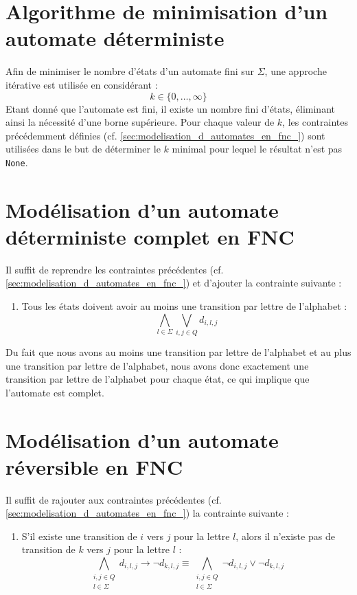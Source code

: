 \documentclass[a4paper, 12pt]{extarticle}
\begin{document}
\section{Algorithme de minimisation d'un automate déterministe}
\label{sec:algo_minimisation}
\noindent Afin de minimiser le nombre d'états d'un automate fini sur $\Sigma$, une approche itérative est utilisée en considérant :
\begin{equation*}
    k\in\{0,\dots,\infty\}
\end{equation*}
Etant donné que l'automate est fini, il existe un nombre fini d'états, éliminant ainsi la nécessité d'une borne supérieure.
Pour chaque valeur de $k$, les contraintes précédemment définies (cf. \ref{sec:modelisation_d_automates_en_fnc_}) sont utilisées
dans le but de déterminer le $k$ minimal pour lequel le résultat n'est pas \texttt{None}.


\section{Modélisation d'un automate déterministe complet en FNC} 
\label{sec:automate_deterministe_complet}
\noindent Il suffit de reprendre les contraintes précédentes (cf. \ref{sec:modelisation_d_automates_en_fnc_}) et d'ajouter la
contrainte suivante :
\begin{enumerate}
    \item Tous les états doivent avoir au moins une transition par lettre de l'alphabet :
    \begin{equation*}
        \bigwedge_{l \in \Sigma} \bigvee_{i,j\in Q} d_{i,l,j}
    \end{equation*}
\end{enumerate}
Du fait que nous avons au moins une transition par lettre de l'alphabet et au plus une transition par lettre de l'alphabet,
nous avons donc exactement une transition par lettre de l'alphabet pour chaque état, ce qui implique que l'automate est complet.


\section{Modélisation d'un automate réversible en FNC}
\noindent Il suffit de rajouter aux contraintes précédentes (cf. \ref{sec:modelisation_d_automates_en_fnc_}) la contrainte suivante :
\begin{enumerate}
    \item S'il existe une transition de $i$ vers $j$ pour la lettre $l$, alors il n'existe pas de transition de $k$ vers $j$ pour la lettre $l$ :
    \begin{equation*}
        \bigwedge_{\substack{i,j \in Q\\l \in \Sigma}} d_{i,l,j} \rightarrow \neg d_{k,l,j}\equiv
        \bigwedge_{\substack{i,j \in Q\\l \in \Sigma}} \neg d_{i,l,j} \vee \neg d_{k,l,j}
    \end{equation*}
\end{enumerate}
\end{document}
